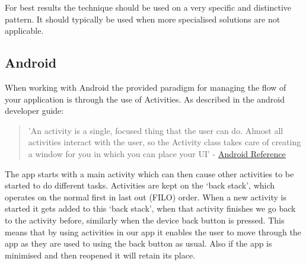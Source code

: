 For best results the technique should be used on a very specific and distinctive pattern. It should typically be used when more specialised solutions are not applicable.

    \subsection{Android}
When working with Android the provided paradigm for managing the flow of your application is through the use of Activities. As described in the android developer guide:

\begin{quote} 'An activity is a single, focused thing that the user can do. Almost all activities interact with the user, so the Activity class takes care of creating a window for you in which you can place your UI' - \href{http://developer.android.com/reference/android/app/Activity.html}{Android Reference}
\end{quote}  

The app starts with a main activity which can then cause other activities to be started to do different tasks. Activities are kept on the ‘back stack’, which operates on the normal first in last out (FILO) order. When a new activity is started it gets added to this ‘back stack’, when that activity finishes we go back to the activity before, similarly when the device back button is pressed. This means that by using
activities in our app it enables the user to move through the app as they are used to using the back button as usual. Also if the app is minimised and then reopened it will retain its place.


